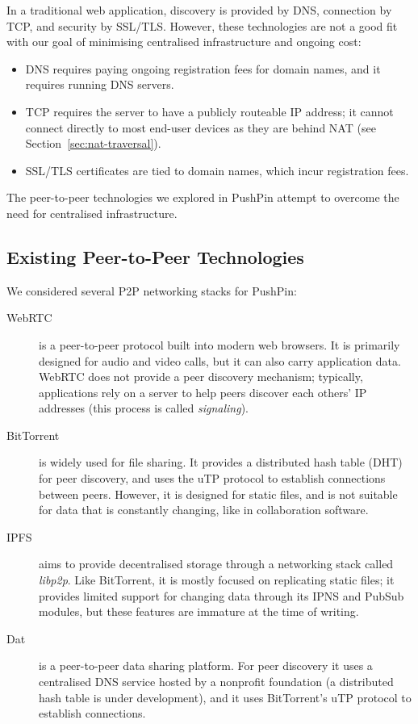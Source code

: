 \documentclass[sigplan,10pt]{acmart}
\begin{document}
In a traditional web application, discovery is provided by DNS, connection by TCP, and security by SSL/TLS.
However, these technologies are not a good fit with our goal of minimising centralised infrastructure and ongoing cost:
\begin{itemize}
    \item DNS requires paying ongoing registration fees for domain names, and it requires running DNS servers.
    \item TCP requires the server to have a publicly routeable IP address; it cannot connect directly to most end-user devices as they are behind NAT (see Section~\ref{sec:nat-traversal}).
    \item SSL/TLS certificates are tied to domain names, which incur registration fees.
\end{itemize}

The peer-to-peer technologies we explored in PushPin attempt to overcome the need for centralised infrastructure.

\subsection{Existing Peer-to-Peer Technologies}

We considered several P2P networking stacks for PushPin:
\begin{description}
\item[WebRTC] is a peer-to-peer protocol built into modern web browsers.
It is primarily designed for audio and video calls, but it can also carry application data.
WebRTC does not provide a peer discovery mechanism; typically, applications rely on a server to help peers discover each others' IP addresses (this process is called \emph{signaling}).
\item[BitTorrent] is widely used for file sharing.
It provides a distributed hash table (DHT) for peer discovery, and uses the uTP protocol to establish connections between peers.
However, it is designed for static files, and is not suitable for data that is constantly changing, like in collaboration software.
\item[IPFS] aims to provide decentralised storage through a networking stack called \emph{libp2p}.
Like BitTorrent, it is mostly focused on replicating static files; it provides limited support for changing data through its IPNS and PubSub modules, but these features are immature at the time of writing.
\item[Dat] \cite{HowDatWorks,Ogden:2018ur} is a peer-to-peer data sharing platform.
For peer discovery it uses a centralised DNS service hosted by a nonprofit foundation (a distributed hash table is under development), and it uses BitTorrent's uTP protocol to establish connections.
\end{description}
\end{document}
